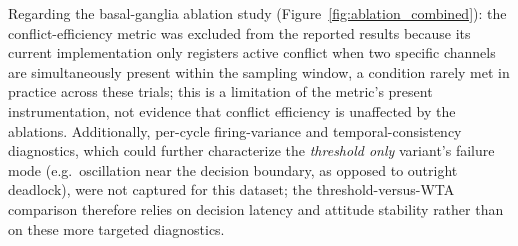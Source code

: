 Regarding the basal-ganglia ablation study (Figure~\ref{fig:ablation_combined}): the conflict-efficiency metric  was excluded from the reported results because its current implementation only registers active conflict when two specific channels are simultaneously present within the sampling window, a condition rarely met in practice across these trials; this is a limitation of the metric's present instrumentation, not evidence that conflict efficiency is unaffected by the ablations. Additionally, per-cycle firing-variance and temporal-consistency diagnostics, which could further characterize the \emph{threshold only} variant's failure mode (e.g.\ oscillation near the decision boundary, as opposed to outright deadlock), were not captured for this dataset; the threshold-versus-WTA comparison therefore relies on decision latency and attitude stability rather than on these more targeted diagnostics.


